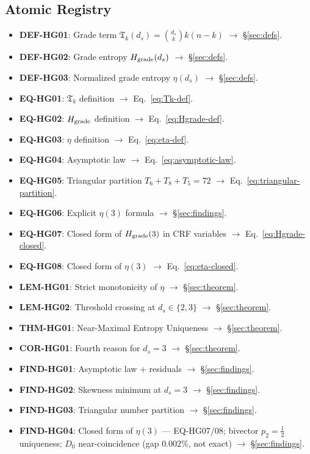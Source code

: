 \documentclass[12pt, a4paper]{article}
\begin{document}
\subsection{Atomic Registry}
\label{sec:registry}

\begin{formalbox}[title={Atomic units introduced by TASK-ZC08}]
\begin{itemize}[leftmargin=*]
  \item \textbf{DEF-HG01}: Grade term
    $\mathfrak{T}_k(d_s) = \binom{d_s}{k} k(n-k)$
    $\to$ \S\ref{sec:defs}.
  \item \textbf{DEF-HG02}: Grade entropy $H_{\rm grade}(d_s)$
    $\to$ \S\ref{sec:defs}.
  \item \textbf{DEF-HG03}: Normalized grade entropy $\eta(d_s)$
    $\to$ \S\ref{sec:defs}.
  \item \textbf{EQ-HG01}: $\mathfrak{T}_k$ definition
    $\to$ Eq.~\eqref{eq:Tk-def}.
  \item \textbf{EQ-HG02}: $H_{\rm grade}$ definition
    $\to$ Eq.~\eqref{eq:Hgrade-def}.
  \item \textbf{EQ-HG03}: $\eta$ definition
    $\to$ Eq.~\eqref{eq:eta-def}.
  \item \textbf{EQ-HG04}: Asymptotic law
    $\to$ Eq.~\eqref{eq:asymptotic-law}.
  \item \textbf{EQ-HG05}: Triangular partition $T_6+T_8+T_5=72$
    $\to$ Eq.~\eqref{eq:triangular-partition}.
  \item \textbf{EQ-HG06}: Explicit $\eta(3)$ formula
    $\to$ \S\ref{sec:findings}.
  \item \textbf{EQ-HG07}: Closed form of $H_{\rm grade}(3)$
    in CRF variables $\to$ Eq.~\eqref{eq:Hgrade-closed}.
  \item \textbf{EQ-HG08}: Closed form of $\eta(3)$
    $\to$ Eq.~\eqref{eq:eta-closed}.
  \item \textbf{LEM-HG01}: Strict monotonicity of $\eta$
    $\to$ \S\ref{sec:theorem}.
  \item \textbf{LEM-HG02}: Threshold crossing at $d_s \in \{2,3\}$
    $\to$ \S\ref{sec:theorem}.
  \item \textbf{THM-HG01}: Near-Maximal Entropy Uniqueness
    $\to$ \S\ref{sec:theorem}.
  \item \textbf{COR-HG01}: Fourth reason for $d_s=3$
    $\to$ \S\ref{sec:theorem}.
  \item \textbf{FIND-HG01}: Asymptotic law + residuals
    $\to$ \S\ref{sec:findings}.
  \item \textbf{FIND-HG02}: Skewness minimum at $d_s=3$
    $\to$ \S\ref{sec:findings}.
  \item \textbf{FIND-HG03}: Triangular number partition
    $\to$ \S\ref{sec:findings}.
  \item \textbf{FIND-HG04}: Closed form of $\eta(3)$ ---
    EQ-HG07/08; bivector $p_2=\tfrac{1}{2}$ uniqueness;
    $D_0$ near-coincidence (gap $0.002\%$, not exact)
    $\to$ \S\ref{sec:findings}.
\end{itemize}
\end{formalbox}
\end{document}

